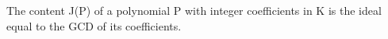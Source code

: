 The content J(P) of a polynomial P with integer coefficients in K is the ideal equal to the GCD of its coefficients.
